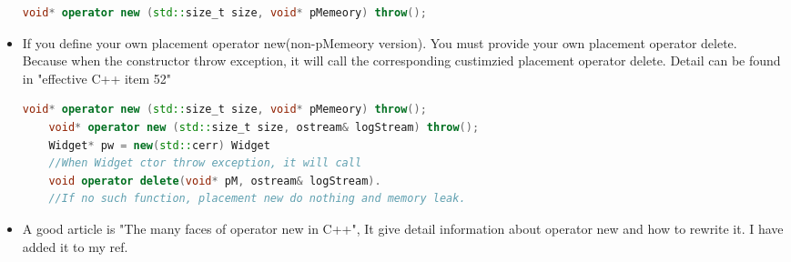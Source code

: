 \documentclass[a4paper,11pt,twoside]{book}
\begin{document}
\begin{itemize}
	\begin{lstlisting}[frame=single, language=c++]
	void* operator new (std::size_t size, void* pMemeory) throw();
	\end{lstlisting}
	
	\item If you define your own placement operator new(non-pMemeory version). You must provide your own placement operator delete. Because when the constructor throw exception, it will call the corresponding custimzied placement operator delete. Detail can be found in "effective C++ item 52"
	\begin{lstlisting}[frame=single, language=c++]
	void* operator new (std::size_t size, void* pMemeory) throw();
	void* operator new (std::size_t size, ostream& logStream) throw();
	Widget* pw = new(std::cerr) Widget
	//When Widget ctor throw exception, it will call 
	void operator delete(void* pM, ostream& logStream). 
	//If no such function, placement new do nothing and memory leak.
	\end{lstlisting}
	
	\item A good article is "The many faces of operator new in C++", It give  detail information about operator new and how to rewrite it. I have added it to my ref.
\end{itemize}
\end{document}
